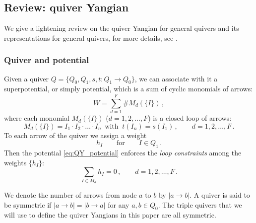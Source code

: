 \documentclass[12pt,a4paper]{article}
\renewcommand{\(}{\left(}
\renewcommand{\)}{\right)}
\renewcommand{\(}{\left(}
\renewcommand{\)}{\right)}
\begin{document}
\subsection{Review: quiver Yangian}\label{ssec:QY_review}

We  give a lightening review on the quiver Yangian for general quivers and its representations for general quivers, for more details, see \cite{Li:2023zub}. 

\subsubsection{Quiver and potential}

Given a quiver $Q=\{Q_0,Q_1,s,t: Q_1\rightarrow Q_0\}$, we can associate with it a superpotential, or simply potential, which is a sum of cyclic monomials of arrows: 
\begin{equation}\label{eq:QY_potential}
	W=\sum_{d=1}^{F}\# M_d(\{I\})\,,
\end{equation}
where each monomial $M_d(\{I\})$ ($d=1,2,\dots,F$) is a closed loop of arrows:
\begin{equation}
	M_d(\{I\})=I_1\cdot I_2\cdot\dots\cdot I_n\,\text{ with }\ t(I_n)=s(I_1)\,,\qquad d=1,2,\dots,F\,.
\end{equation}
To each arrow of the quiver we assign a weight
\begin{equation}
	h_I\qquad \mathrm{for}\qquad  I\in Q_1\,.
\end{equation}
Then the potential \eqref{eq:QY_potential} enforces the \textit{loop constraints} among the weights $\{h_I\}$:
\begin{equation}\label{eq:loop_cons}
	\sum_{I\in M_d}h_I=0\,,\qquad d=1,2,\dots,F\,.
\end{equation}


We denote the number of arrows from node $a$ to $b$ by $|a\rightarrow b|$.
A quiver is said to be symmetric if $|a\rightarrow b|=|b\rightarrow a|$ for any $a,b\in Q_0$. 
The triple quivers that we will use to define the quiver Yangians in this paper are all symmetric. 
\end{document}
